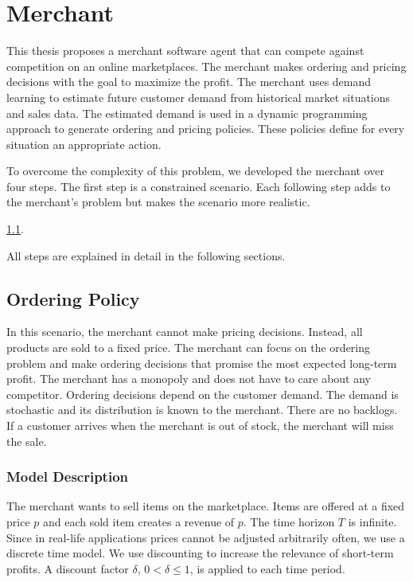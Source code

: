 \chapter{Merchant}
This thesis proposes a merchant software agent that can compete against competition on an online marketplaces.
The merchant makes ordering and pricing decisions with the goal to maximize the profit.
The merchant uses demand learning to estimate future customer demand from historical market situations and sales data.
The estimated demand is used in a dynamic programming approach to generate ordering and pricing policies.
These policies define for every situation an appropriate action.

To overcome the complexity of this problem, we developed the merchant over four steps.
The first step is a constrained scenario.
Each following step adds to the merchant's problem but makes the scenario more realistic.

 \cref{section:ordering_policy}.

All steps are explained in detail in the following sections.

\section{Ordering Policy}
\label{section:ordering_policy}
In this scenario, the merchant cannot make pricing decisions.
Instead, all products are sold to a fixed price.
The merchant can focus on the ordering problem and make ordering decisions that promise the most expected long-term profit.
The merchant has a monopoly and does not have to care about any competitor.
Ordering decisions depend on the customer demand.
The demand is stochastic and its distribution is known to the merchant.
There are no backlogs. %
If a customer arrives when the merchant is out of stock, the merchant will miss the sale.

\subsection{Model Description}
The merchant wants to sell items on the marketplace.
Items are offered at a fixed price $p$ and each sold item creates a revenue of $p$.
The time horizon $T$ is infinite.
Since in real-life applications prices cannot be adjusted arbitrarily often, we use a discrete time
model.
We use discounting to increase the relevance of short-term profits.
A discount factor $\delta$, $0 < \delta \leq 1$, is applied to each time period.

